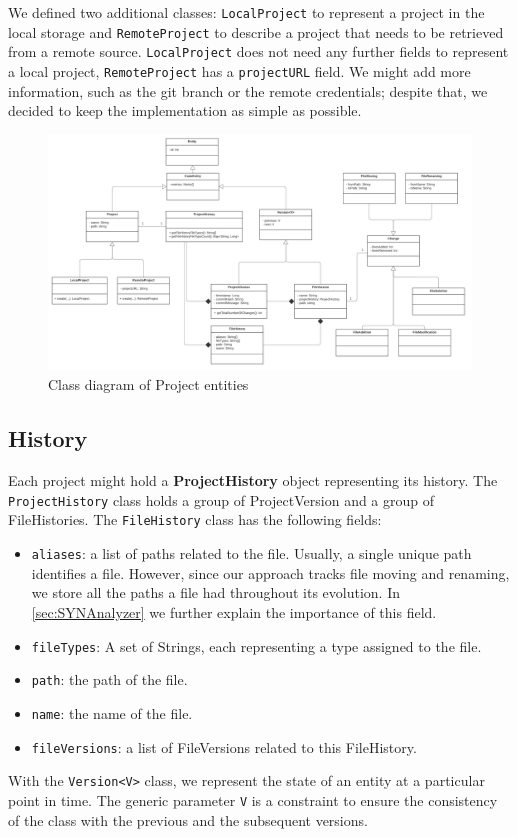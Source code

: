 We defined two additional classes: \texttt{LocalProject} to represent a project in the local storage and \texttt{RemoteProject} to describe a project that needs to be retrieved from a remote source. 
\texttt{LocalProject} does not need any further fields to represent a local project, \texttt{RemoteProject} has a \texttt{projectURL} field. We might add more information, such as the git branch or the remote credentials; despite that, we decided to keep the implementation as simple as possible. 


\begin{figure}
    \center
    \includegraphics[width=\textwidth]{SYNClass.png}
    \caption{Class diagram of Project entities}
    \label{fig:SYNCLass}
\end{figure}

\subsection*{History}

Each project might hold a \textbf{ProjectHistory} object representing its history. 
The \texttt{ProjectHistory} class holds a group of ProjectVersion and a group of FileHistories. The \texttt{FileHistory} class has the following fields:
\begin{itemize}
    \item \texttt{aliases}: a list of paths related to the file. Usually, a single unique path identifies a file. However, since our approach tracks file moving and renaming, we store all the paths a file had throughout its evolution. In \autoref{sec:SYNAnalyzer} we further explain the importance of this field. 
    \item \texttt{fileTypes}: A set of Strings, each representing a type assigned to the file. 
    \item \texttt{path}: the path of the file. 
    \item \texttt{name}: the name of the file.
    \item \texttt{fileVersions}: a list of FileVersions related to this FileHistory. 
\end{itemize}
With the \texttt{Version<V>} class, we represent the state of an entity at a particular point in time. 
The generic parameter \texttt{V} is a constraint to ensure the consistency of the class with the previous and the subsequent versions. 

